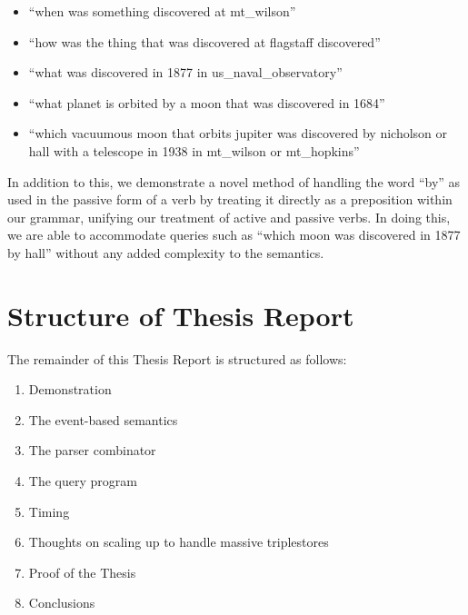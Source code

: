 \documentclass[../main.tex]{subfiles}
\begin{document}
\begin{itemize}
	\item ``when was something discovered at mt\_wilson''
	\item ``how was the thing that was discovered at flagstaff discovered''
	\item ``what was discovered in 1877 in us\_naval\_observatory''
	\item ``what planet is orbited by a moon that was discovered in 1684''
	\item ``which vacuumous moon that orbits jupiter was discovered by nicholson or hall with a telescope in 1938 in mt\_wilson or mt\_hopkins''
\end{itemize}

In addition to this, we demonstrate a novel method of handling the word ``by'' as used in the passive form of a verb by treating it directly as a preposition within our grammar, unifying our treatment of active and passive verbs.  In doing this, we are able to accommodate queries such as ``which moon was discovered in 1877 by hall'' without any added complexity to the semantics.

\section{Structure of Thesis Report}

The remainder of this Thesis Report is structured as follows:

\begin{enumerate}
	\item Demonstration
	\item The event-based semantics
	\item The parser combinator
	\item The query program
	\item Timing
	\item Thoughts on scaling up to handle massive triplestores
	\item Proof of the Thesis
	\item Conclusions
\end{enumerate}
\end{document}
